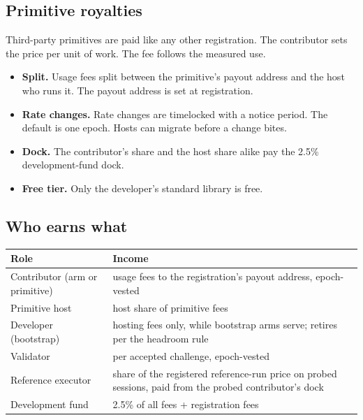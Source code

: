 \documentclass[11pt]{article}
\begin{document}
\subsection{Primitive royalties}

Third-party primitives are paid like any other registration. The
contributor sets the price per unit of work. The fee follows the
measured use.
\begin{itemize}
\item \textbf{Split.} Usage fees split between the primitive's
payout address and the host who runs it. The payout address is
set at registration.
\item \textbf{Rate changes.} Rate changes are timelocked with a
notice period. The default is one epoch. Hosts can migrate before
a change bites.
\item \textbf{Dock.} The contributor's share and the host share
alike pay the 2.5\% development-fund dock.
\item \textbf{Free tier.} Only the developer's standard library is
free.
\end{itemize}

\subsection{Who earns what}

\begin{center}
\begin{tabular}{@{}p{4.8cm}p{9.4cm}@{}}
\toprule
\textbf{Role} & \textbf{Income} \\
\midrule
Contributor (arm or primitive) & usage fees to the registration's
payout address, epoch-vested \\
Primitive host & host share of primitive fees \\
Developer (bootstrap) & hosting fees only, while bootstrap arms
serve; retires per the headroom rule \\
Validator & per accepted challenge, epoch-vested \\
Reference executor & share of the registered reference-run price
on probed sessions, paid from the probed contributor's dock \\
Development fund & 2.5\% of all fees + registration fees \\
\bottomrule
\end{tabular}
\end{center}
\end{document}
